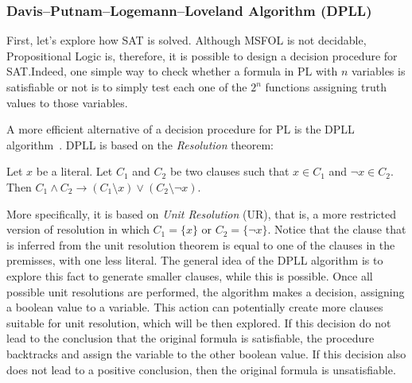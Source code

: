 \subsubsection{Davis–Putnam–Logemann–Loveland Algorithm (DPLL)}

First, let’s explore how SAT is solved. Although MSFOL is not decidable, Propositional Logic is, therefore, it is possible to design a decision procedure for SAT.\@ Indeed, one simple way to check whether a formula in PL with $n$ variables is satisfiable or not is to simply test each one of the $2^{n}$ functions assigning truth values to those variables.

A more efficient alternative of a decision procedure for PL is the DPLL algorithm~\cite{dpll}. DPLL is based on the \textit{Resolution} theorem:

\begin{theorem}[Resolution]\label{res_theorem}
Let $x$ be a literal. Let $C_{1}$ and $C_{2}$ be two clauses such that $x \in C_{1}$ and $\neg x \in C_{2}$. Then $C_{1} \wedge C_{2} \rightarrow (C_{1} \setminus x) \vee (C_{2} \setminus \neg x)$.
\end{theorem}

More specifically, it is based on \textit{Unit Resolution} (UR), that is, a more restricted version of resolution in which $C_{1} = \{x\}$ or $C_{2} = \{\neg x\}$. Notice that the clause that is inferred from the unit resolution theorem is equal to one of the clauses in the premisses, with one less literal. The general idea of the DPLL algorithm is to explore this fact to generate smaller clauses, while this is possible. Once all possible unit resolutions are performed, the algorithm makes a decision, assigning a boolean value to a variable. This action can potentially create more clauses suitable for unit resolution, which will be then explored. If this decision do not lead to the conclusion that the original formula is satisfiable, the procedure backtracks and assign the variable to the other boolean value. If this decision also does not lead to a positive conclusion, then the original formula is unsatisfiable.

